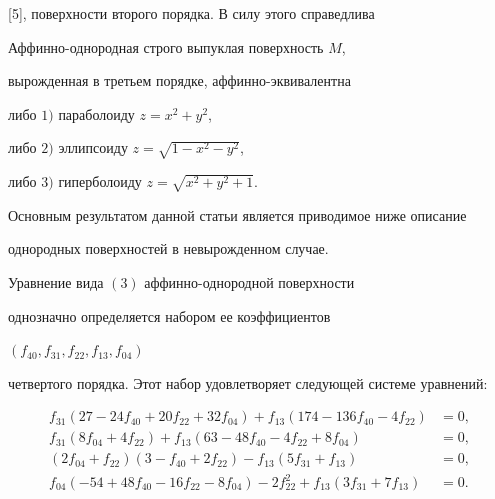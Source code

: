 [5], поверхности второго порядка. В силу этого справедлива





\begin{thm}


Аффинно-однородная строго выпуклая поверхность $M$,


вырожденная в третьем порядке, аффинно-эквивалентна





либо $1)$ параболоиду $z=x^2+y^2$,





либо $2)$ эллипсоиду $z=\sqrt{1 - x^2 - y^2}$,





либо $3)$ гиперболоиду $z=\sqrt{x^2+y^2+1}$.


\end{thm}





Основным результатом данной статьи является приводимое ниже описание


однородных поверхностей в невырожденном случае.





\begin{thm}


Уравнение вида $(3)$ аффинно-однородной поверхности


однозначно определяется набором ее коэффициентов


$(f_{40}, f_{31}, f_{22}, f_{13}, f_{04})$


четвертого порядка. Этот набор удовлетворяет следующей системе уравнений$:$


\begin{equation}


\begin{split}


f_{31} (27 - 24 f_{40}+20 f_{22}+32 f_{04})+


f_{13} (174 - 136 f_{40} - 4 f_{22}) &=0, \\


f_{31} (8 f_{04}+4 f_{22})+


f_{13} (63 - 48 f_{40} - 4 f_{22}+8 f_{04}) &=0, \\


(2 f_{04}+f_{22}) (3 - f_{40}+2 f_{22}) -


f_{13} (5 f_{31}+f_{13}) &=0, \\


f_{04} (- 54+48 f_{40} - 16 f_{22} - 8 f_{04}) - 2 f_{22}^2+


f_{13} (3 f_{31}+7 f_{13}) &=0.


\end{split}


\end{equation}


\end{thm}





